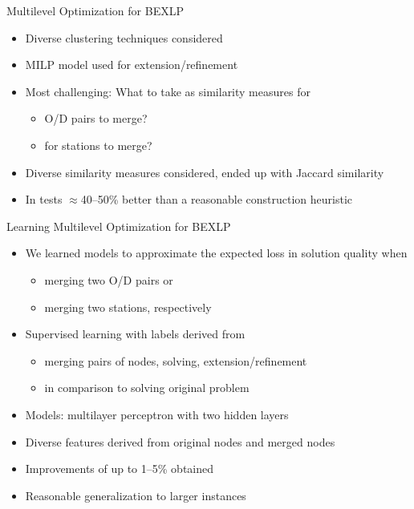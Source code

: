 \documentclass[aspectratio=1610]{beamer}
\newcommand{\important}[1]{{\color{green!60!black}#1}}
\begin{document}
\begin{frame}{Multilevel Optimization for BEXLP}
\begin{itemize}
	\itemsep3ex
	\item Diverse clustering techniques considered
	\item MILP model used for extension/refinement
	\item Most challenging: What to take as \important{similarity measures} for
	\begin{itemize}
		\item O/D pairs to merge?
		\item for stations to merge?
	\end{itemize}
	\item Diverse similarity measures considered, ended up with Jaccard similarity
	\item In tests \important{$\approx$40--50\% better} than a reasonable construction heuristic
\end{itemize}
\end{frame}

\begin{frame}{Learning Multilevel Optimization for BEXLP}
	\citep{tomandl-24}

	\bigskip
	\begin{itemize}
		\itemsep2ex
		\item We \important{learned models to approximate the expected loss in solution quality} when
		\begin{itemize}
			\item merging two O/D pairs or 
			\item merging two stations, respectively
		\end{itemize} 
		\item Supervised learning with labels derived from
		\begin{itemize}
			\item merging pairs of nodes, solving, extension/refinement
			\item in comparison to solving original problem
		\end{itemize} 
		\item Models: multilayer perceptron with two hidden layers
		\item Diverse features derived from original nodes and merged nodes
		\item \important{Improvements of up to 1--5\% obtained}
		\item \important{Reasonable generalization to larger instances}
	\end{itemize}
\end{frame}
\end{document}
